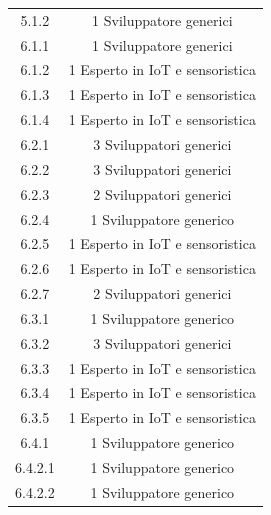 \begin{table}[H]
\begin{tabular}{|c|c|}
        5.1.2             & 1 Sviluppatore generici                                      \\
        6.1.1             & 1 Sviluppatore generici                                      \\
        6.1.2             & 1 Esperto in IoT e sensoristica                              \\
        6.1.3             & 1 Esperto in IoT e sensoristica                              \\
        6.1.4             & 1 Esperto in IoT e sensoristica                              \\
        6.2.1             & 3 Sviluppatori generici                                      \\
        6.2.2             & 3 Sviluppatori generici                                      \\
        6.2.3             & 2 Sviluppatori generici                                      \\
        6.2.4             & 1 Sviluppatore generico                                      \\
        6.2.5             & 1 Esperto in IoT e sensoristica                              \\
        6.2.6             & 1 Esperto in IoT e sensoristica                              \\
        6.2.7             & 2 Sviluppatori generici                                      \\
        6.3.1             & 1 Sviluppatore generico                                      \\
        6.3.2             & 3 Sviluppatori generici                                      \\
        6.3.3             & 1 Esperto in IoT e sensoristica                              \\
        6.3.4             & 1 Esperto in IoT e sensoristica                              \\
        6.3.5             & 1 Esperto in IoT e sensoristica                              \\
        6.4.1             & 1 Sviluppatore generico                                      \\
        6.4.2.1           & 1 Sviluppatore generico                                      \\
        6.4.2.2           & 1 Sviluppatore generico                                      \\

\end{tabular}
\end{table}
